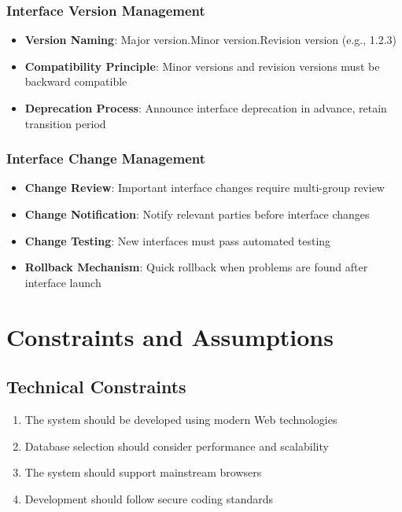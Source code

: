 \documentclass[a4paper,12pt]{article}
\begin{document}
\subsubsection{Interface Version Management}

\begin{itemize}
  \item \textbf{Version Naming}: Major version.Minor version.Revision version (e.g., 1.2.3)
  \item \textbf{Compatibility Principle}: Minor versions and revision versions must be backward compatible
  \item \textbf{Deprecation Process}: Announce interface deprecation in advance, retain transition period
\end{itemize}

\subsubsection{Interface Change Management}

\begin{itemize}
  \item \textbf{Change Review}: Important interface changes require multi-group review
  \item \textbf{Change Notification}: Notify relevant parties before interface changes
  \item \textbf{Change Testing}: New interfaces must pass automated testing
  \item \textbf{Rollback Mechanism}: Quick rollback when problems are found after interface launch
\end{itemize}

\section{Constraints and Assumptions}

\subsection{Technical Constraints}

\begin{enumerate}
  \item The system should be developed using modern Web technologies
  \item Database selection should consider performance and scalability
  \item The system should support mainstream browsers
  \item Development should follow secure coding standards
\end{enumerate}
\end{document}
